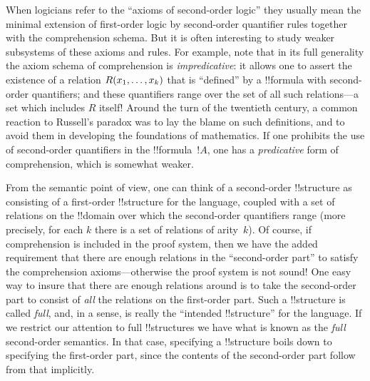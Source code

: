 \documentclass[../../include/open-logic-section]{subfiles}
\begin{document}
When logicians refer to the ``axioms of second-order logic'' they
usually mean the minimal extension of first-order logic by
second-order quantifier rules together with the comprehension
schema. But it is often interesting to study weaker subsystems of
these axioms and rules. For example, note that in its full generality
the axiom schema of comprehension is \emph{impredicative}: it allows
one to assert the existence of a relation $\mathord{R}(x_1, \dots, x_k)$
that is ``defined'' by a !!{formula} with second-order quantifiers; and
these quantifiers range over the set of all such relations---a set
which includes $R$ itself!{} Around the turn of the twentieth century, a
common reaction to Russell's paradox was to lay the blame on such
definitions, and to avoid them in developing the foundations of
mathematics. If one prohibits the use of second-order quantifiers in
the !!{formula}~$!A$, one has a {\em predicative} form of
comprehension, which is somewhat weaker.

From the semantic point of view, one can think of a second-order
!!{structure} as consisting of a first-order !!{structure} for the
language, coupled with a set of relations on the !!{domain} over which
the second-order quantifiers range (more precisely, for each $k$ there
is a set of relations of arity~$k$). Of course, if comprehension is
included in the proof system, then we have the added requirement that
there are enough relations in the ``second-order part'' to satisfy the
comprehension axioms---otherwise the proof system is not sound!{} One
easy way to insure that there are enough relations around is to take
the second-order part to consist of \emph{all} the relations on the
first-order part. Such a !!{structure} is called \emph{full}, and, in a
sense, is really the ``intended !!{structure}'' for the language. If
we restrict our attention to full !!{structure}s we have what is known
as the \emph{full} second-order semantics. In that case, specifying a
!!{structure} boils down to specifying the first-order part, since the
contents of the second-order part follow from that implicitly.
\end{document}
